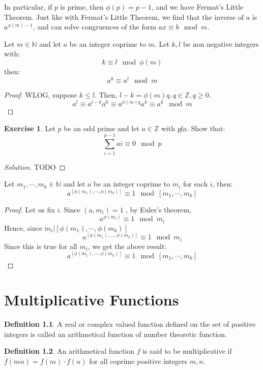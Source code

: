 \documentclass[12pt,letterpaper]{amsbook}
\theoremstyle{definition}
\newtheorem{definition}{Definition} %
\newtheorem*{exercise}{Exercise}
\newenvironment{solution}
  {\renewcommand\qedsymbol{$\blacksquare$}\begin{proof}[Solution]}
  {\end{proof}}
\newcommand{\N}{\mathbb{N}}
\newcommand{\Z}{\mathbb{Z}}
\begin{document}
In particular, if $p$ is prime, then $\phi(p) = p-1$, and we have Fermat's Little Theorem. Just like with Fermat's Little Theorem, we find that the inverse of $a$ is $a^{\phi(m)-1}$, and can solve congruences of the form $ax \equiv b \mod m$.

\begin{lemma}
  Let $m \in \N$ and let $a$ be an integer coprime to $m$. Let $k,l$ be non negative integers with:
  \[k \equiv l \mod \phi(m)\]
  then:
  \[a^k \equiv a^l \mod m\]
\end{lemma}
\begin{proof}
  WLOG, suppose $k \leq l$. Then, $l-k = \phi(m) q, q \in \Z, q \geq 0$.
  \[a^l \equiv a^{l-k}a^k \equiv a^{\phi(m)q}a^k \equiv a^k \mod m\]
\end{proof}

\begin{exercise}
  Let $p$ be an odd prime and let $a \in \Z$ with $p \not | a$. Show that:
  \[\sum_{i=1}^{p-1} ai \equiv 0 \mod p\]
\end{exercise}
\begin{solution}
  TODO 
\end{solution}

\begin{theorem}
  Let $m_1, \cdots, m_k \in \N$ and let $a$ be an integer coprime to $m_i$ for each $i$, then:
\[a^{[\phi(m_1), \cdots, \phi(m_k)]} \equiv 1 \mod [m_1 , \cdots, m_k]\]
\end{theorem}
\begin{proof}
  Let us fix $i$. Since $(a,m_i) = 1$ , by Euler's theorem,
  \[a^{\phi(m_i)} \equiv 1 \mod m_i\]
  Hence, since $m_i | [\phi(m_1) , \cdots , \phi(m_k)]$
  \[a^{[\phi(m_1), ..., \phi(m_k)]} \equiv 1 \mod m_i\]
  Since this is true for all $m_i$, we get the above result:
\[a^{[\phi(m_1), \cdots, \phi(m_k)]} \equiv 1 \mod [m_1 , \cdots, m_k]\]
\end{proof}

\chapter{Multiplicative Functions}

\begin{definition}
  A real or complex valued function defined on the set of positive integers is called an arithmetical function of number theoretic function. 
\end{definition}

\begin{definition}
  An arithmetical function $f$ is said to be multiplicative if $f(mn) = f(m) \cdot f(n)$ for all coprime positive integers $m,n$.
\end{definition}
\end{document}
